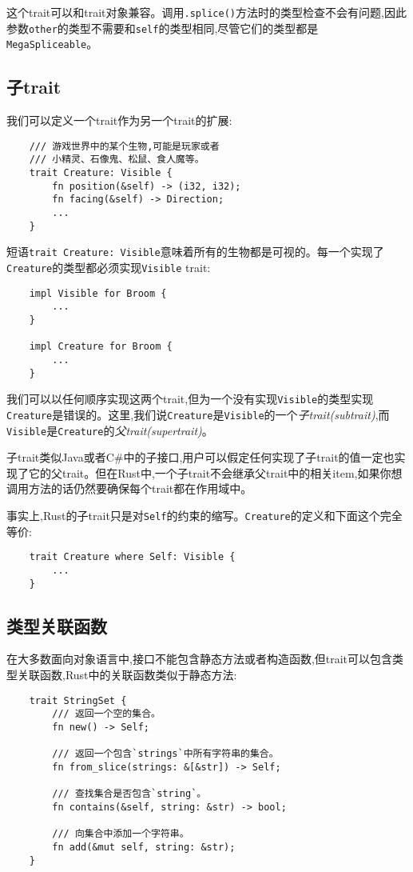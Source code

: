 这个trait可以和trait对象兼容。调用\texttt{.splice()}方法时的类型检查不会有问题,因此参数\texttt{other}的类型不需要和\texttt{self}的类型相同,尽管它们的类型都是\texttt{MegaSpliceable}。

\subsection{子trait}\label{subtrait}
我们可以定义一个trait作为另一个trait的扩展:
\begin{verbatim}
    /// 游戏世界中的某个生物,可能是玩家或者
    /// 小精灵、石像鬼、松鼠、食人魔等。
    trait Creature: Visible {
        fn position(&self) -> (i32, i32);
        fn facing(&self) -> Direction;
        ...
    }
\end{verbatim}

短语\texttt{trait Creature: Visible}意味着所有的生物都是可视的。每一个实现了\texttt{Creature}的类型都必须实现\texttt{Visible} trait:
\begin{verbatim}
    impl Visible for Broom {
        ...
    }

    impl Creature for Broom {
        ...
    }
\end{verbatim}
我们可以以任何顺序实现这两个trait,但为一个没有实现\texttt{Visible}的类型实现\texttt{Creature}是错误的。这里,我们说\texttt{Creature}是\texttt{Visible}的一个\emph{子trait(subtrait)},而\texttt{Visible}是\texttt{Creature}的\emph{父trait(supertrait)}。

子trait类似Java或者C\#中的子接口,用户可以假定任何实现了子trait的值一定也实现了它的父trait。但在Rust中,一个子trait不会继承父trait中的相关item,如果你想调用方法的话仍然要确保每个trait都在作用域中。

事实上,Rust的子trait只是对\texttt{Self}的约束的缩写。\texttt{Creature}的定义和下面这个完全等价:
\begin{verbatim}
    trait Creature where Self: Visible {
        ...
    }
\end{verbatim}

\subsection{类型关联函数}
在大多数面向对象语言中,接口不能包含静态方法或者构造函数,但trait可以包含类型关联函数,Rust中的关联函数类似于静态方法:
\begin{verbatim}
    trait StringSet {
        /// 返回一个空的集合。
        fn new() -> Self;
        
        /// 返回一个包含`strings`中所有字符串的集合。
        fn from_slice(strings: &[&str]) -> Self;

        /// 查找集合是否包含`string`。
        fn contains(&self, string: &str) -> bool;

        /// 向集合中添加一个字符串。
        fn add(&mut self, string: &str);
    }
\end{verbatim}

